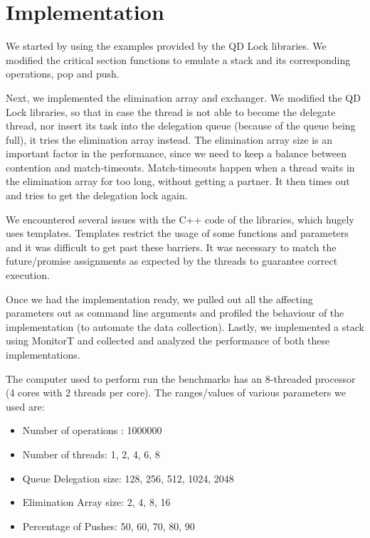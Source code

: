 \section{Implementation}
We started by using the examples provided by the QD Lock libraries. We modified the critical section functions to emulate a stack and its corresponding operations, pop and push. 

Next, we implemented the elimination array and exchanger. We modified the QD Lock libraries, so that in case the thread is not able to become the delegate thread, nor insert its task into the delegation queue (because of the queue being full), it tries the elimination array instead. The elimination array size is an important factor in the performance, since we need to keep a balance between contention and match-timeouts. Match-timeouts happen when a thread waits in the elimination array for too long, without getting a partner. It then times out and tries to get the delegation lock again.

We encountered several issues with the C++ code of the libraries, which hugely uses templates. Templates restrict the usage of some functions and parameters and it was difficult to get past these barriers. It was necessary to match the future/promise assignments as expected by the threads to guarantee correct execution.

Once we had the implementation ready, we pulled out all the affecting parameters out as command line arguments and profiled the behaviour of the implementation (to automate the data collection). Lastly, we implemented a stack using MonitorT and collected and analyzed the performance of both these implementations.

The computer used to perform run the benchmarks has an 8-threaded processor (4 cores with 2 threads per core). The ranges/values of various parameters we used are:
\begin{itemize}
\item Number of operations : 1000000
\item Number of threads: 1, 2, 4, 6, 8
\item Queue Delegation size: 128, 256, 512, 1024, 2048
\item Elimination Array size: 2, 4, 8, 16
\item Percentage of Pushes: 50, 60, 70, 80, 90
\end{itemize}

